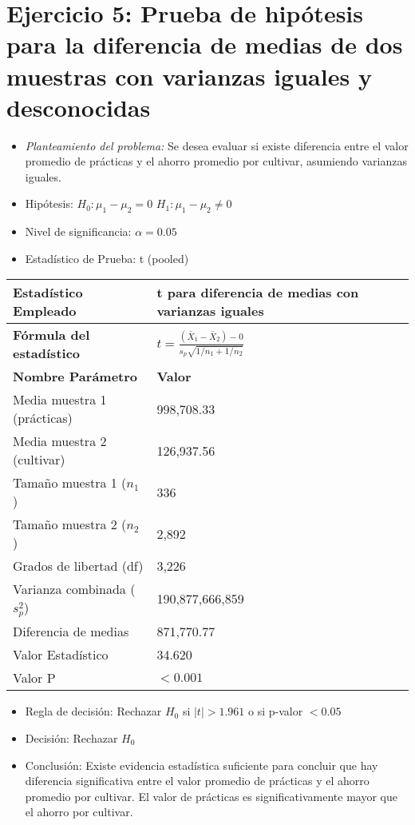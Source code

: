 \documentclass[12pt,a4paper]{article}
\begin{document}
\section*{Ejercicio 5: Prueba de hipótesis para la diferencia de medias de dos muestras con varianzas iguales y desconocidas}
\begin{itemize}
    \item \textit{Planteamiento del problema:} Se desea evaluar si existe diferencia entre el valor promedio de prácticas y el ahorro promedio por cultivar, asumiendo varianzas iguales.
    \item Hipótesis: \quad $H_{0}: \mu_1 - \mu_2 = 0$ \hspace{2cm} $H_{1}: \mu_1 - \mu_2 \neq 0$
    \item Nivel de significancia: $\alpha = 0.05$
    \item Estadístico de Prueba: t (pooled)
\end{itemize}

\begin{tabular}{|m{7cm}|m{7cm}|}
\hline
\textbf{Estadístico Empleado} & t para diferencia de medias con varianzas iguales \\ \hline
\textbf{Fórmula del estadístico} & $t = \frac{(\bar{X}_1 - \bar{X}_2) - 0}{s_p\sqrt{1/n_1 + 1/n_2}}$ \\ \hline
\textbf{Nombre Parámetro} & \textbf{Valor} \\ \hline
Media muestra 1 (prácticas) & 998,708.33 \\ \hline
Media muestra 2 (cultivar) & 126,937.56 \\ \hline
Tamaño muestra 1 ($n_1$) & 336 \\ \hline
Tamaño muestra 2 ($n_2$) & 2,892 \\ \hline
Grados de libertad (df) & 3,226 \\ \hline
Varianza combinada ($s_p^2$) & 190,877,666,859 \\ \hline
Diferencia de medias & 871,770.77 \\ \hline
Valor Estadístico & 34.620 \\ \hline
Valor P & $< 0.001$ \\ \hline
\end{tabular}

\begin{itemize}
    \item Regla de decisión: Rechazar $H_0$ si $|t| > 1.961$ o si p-valor $< 0.05$
    \item Decisión: Rechazar $H_0$
    \item Conclusión: Existe evidencia estadística suficiente para concluir que hay diferencia significativa entre el valor promedio de prácticas y el ahorro promedio por cultivar. El valor de prácticas es significativamente mayor que el ahorro por cultivar.
\end{itemize}
\end{document}

